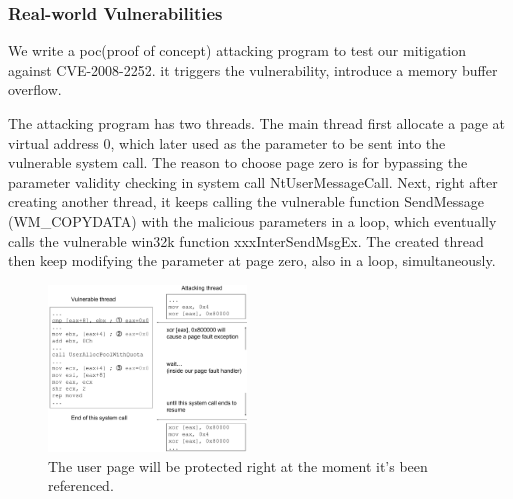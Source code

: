 
\subsubsection{Real-world Vulnerabilities}

We write a poc(proof of concept) attacking program to test our mitigation against CVE-2008-2252. it triggers the vulnerability, introduce a memory buffer overflow. 


The attacking program has two threads. The main thread first allocate a page at virtual address 0, which later used as the parameter to be sent into the vulnerable system call. The reason to choose page zero is for bypassing the parameter validity checking in system call NtUserMessageCall. Next, right after creating another thread, it keeps calling the vulnerable function SendMessage (WM\_COPYDATA) with the malicious parameters in a loop, which eventually calls the vulnerable win32k function xxxInterSendMsgEx. The created thread then keep modifying the parameter at page zero, also in a loop, simultaneously.

\begin{figure}[th]
  \includegraphics[width=0.47\textwidth]{figures/ms08061case}
  \centering
  \caption{The user page will be protected right at the moment it's been referenced.}
  \label{fig:ms08061case}
\end{figure}

